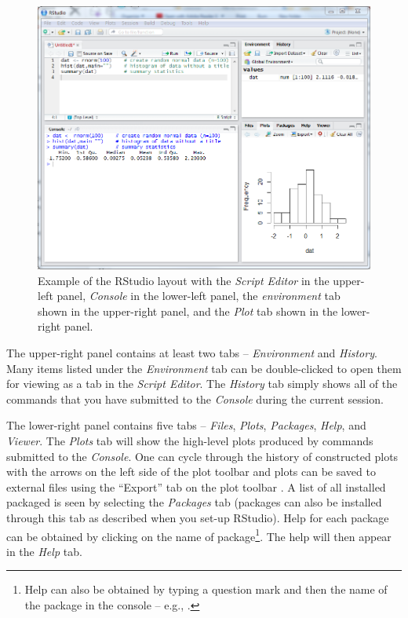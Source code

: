\documentclass{article}\usepackage[]{graphicx}\usepackage[]{color}
\begin{document}
\begin{figure}[h!]
  \centering
    \includegraphics[width=6in]{Figs/RStudio_Intro_Layout.png}
    \caption{Example of the RStudio layout with the \textit{Script Editor} in the upper-left panel, \textit{Console} in the lower-left panel, the \textit{environment} tab shown in the upper-right panel, and the \textit{Plot} tab shown in the lower-right panel.}
  \label{fig:RStudioLayout}
\end{figure}

The upper-right panel contains at least two tabs -- \textit{Environment} and \textit{History}.  Many items listed under the \textit{Environment} tab can be double-clicked to open them for viewing as a tab in the \textit{Script Editor}.  The \textit{History} tab simply shows all of the commands that you have submitted to the \textit{Console} during the current session.

The lower-right panel contains five tabs -- \textit{Files}, \textit{Plots}, \textit{Packages}, \textit{Help}, and \textit{Viewer}.  The \textit{Plots} tab will show the high-level plots produced by commands submitted to the \textit{Console}.  One can cycle through the history of constructed plots with the arrows on the left side of the plot toolbar and plots can be saved to external files using the ``Export'' tab on the plot toolbar .  A list of all installed packaged is seen by selecting the \textit{Packages} tab (packages can also be installed through this tab as described when you set-up RStudio).  Help for each package can be obtained by clicking on the name of package\footnote{Help can also be obtained by typing a question mark and then the name of the package in the console -- e.g., .}.  The help will then appear in the \textit{Help} tab.
\end{document}
